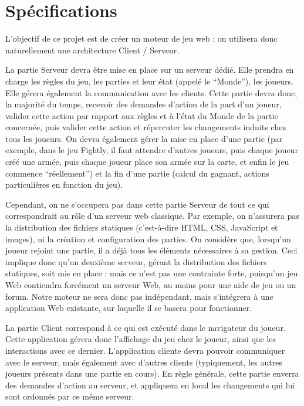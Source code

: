 \documentclass[a4paper,10pt]{report}
\begin{document}
    \section{Spécifications}

      L'objectif de ce projet est de créer un moteur de jeu web : on utilisera donc naturellement une architecture Client / Serveur. 

      La partie Serveur devra être mise en place sur un serveur dédié. Elle prendra en charge les règles du jeu, les parties et leur état (appelé le ``Monde''), les joueurs. Elle gérera également la communication avec les clients. Cette partie devra donc, la majorité du temps, recevoir des demandes d'action de la part d'un joueur, valider cette action par rapport aux règles et à l'état du Monde de la partie concernée, puis valider cette action et répercuter les changements induits chez tous les joueurs. On devra également gérer la mise en place d'une partie (par exemple, dans le jeu Fightly, il faut attendre d'autres joueurs, puis chaque joueur créé une armée, puis chaque joueur place son armée sur la carte, et enfin le jeu commence ``réellement'') et la fin d'une partie (calcul du gagnant, actions particulières en fonction du jeu). 
      
      Cependant, on ne s'occupera pas dans cette partie Serveur de tout ce qui correspondrait au rôle d'un serveur web classique. Par exemple, on n'assurera pas la distribution des fichiers statiques (c'est-à-dire HTML, CSS, JavaScript et images), ni la création et configuration des parties. On considère que, lorsqu'un joueur rejoint une partie, il a déjà tous les éléments nécessaires à sa gestion. Ceci implique donc qu'un deuxième serveur, gérant la distribution des fichiers statiques, soit mis en place : mais ce n'est pas une contrainte forte, puisqu'un jeu Web contiendra forcément un serveur Web, au moins pour une aide de jeu ou un forum. Notre moteur ne sera donc pas indépendant, mais s'intégrera à une application Web existante, sur laquelle il se basera pour fonctionner. 

      La partie Client correspond à ce qui est exécuté dans le navigateur du joueur. Cette application gérera donc l'affichage du jeu chez le joueur, ainsi que les interactions avec ce dernier. L'application cliente devra pouvoir communiquer avec le serveur, mais également avec d'autres clients (typiquement, les autres joueurs présents dans une partie en cours). En règle générale, cette partie enverra des demandes d'action au serveur, et appliquera en local les changements qui lui sont ordonnés par ce même serveur. 
\end{document}
